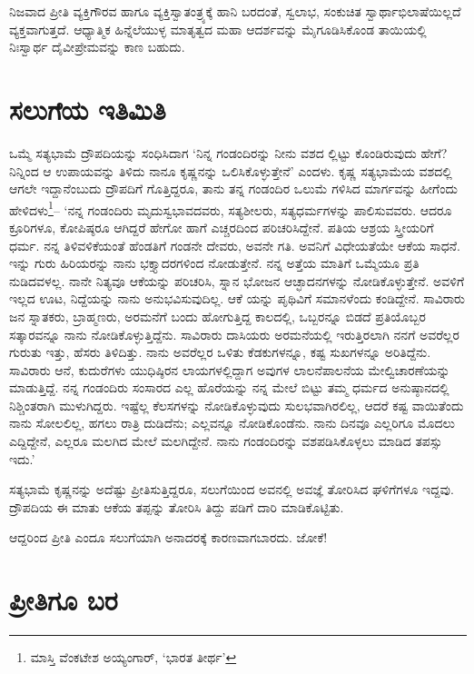 ನಿಜವಾದ ಪ್ರೀತಿ ವ್ಯಕ್ತಿಗೌರವ ಹಾಗೂ ವ್ಯಕ್ತಿಸ್ವಾತಂತ್ರ್ಯಕ್ಕೆ ಹಾನಿ ಬರದಂತೆ, ಸ್ವಲಾಭ, ಸಂಕುಚಿತ ಸ್ವಾರ್ಥಾಭಿಲಾಷೆಯಿಲ್ಲದೆ ವ್ಯಕ್ತವಾಗುತ್ತದೆ. ಆಧ್ಯಾತ್ಮಿಕ ಹಿನ್ನೆಲೆಯುಳ್ಳ ಮಾತೃತ್ವದ ಮಹಾ ಆದರ್ಶವನ್ನು ಮೈಗೂಡಿಸಿಕೊಂಡ ತಾಯಿಯಲ್ಲಿ ನಿಃಸ್ವಾರ್ಥ ದೈವೀಪ್ರೇಮವನ್ನು ಕಾಣ ಬಹುದು.


\section{ಸಲುಗೆಯ ಇತಿಮಿತಿ}

ಒಮ್ಮೆ ಸತ್ಯಭಾಮೆ ದ್ರೌಪದಿಯನ್ನು ಸಂಧಿಸಿದಾಗ ‘ನಿನ್ನ ಗಂಡಂದಿರನ್ನು ನೀನು ವಶದ ಲ್ಲಿಟ್ಟು ಕೊಂಡಿರುವುದು ಹೇಗೆ? ನಿನ್ನಿಂದ ಆ ಉಪಾಯವನ್ನು ತಿಳಿದು ನಾನೂ ಕೃಷ್ಣನನ್ನು ಒಲಿಸಿಕೊಳ್ಳುತ್ತೇನೆ’ ಎಂದಳು. ಕೃಷ್ಣ ಸತ್ಯಭಾಮೆಯ ವಶದಲ್ಲಿ ಆಗಲೇ ಇದ್ದಾನೆಂಬುದು ದ್ರೌಪದಿಗೆ ಗೊತ್ತಿದ್ದರೂ, ತಾನು ತನ್ನ ಗಂಡಂದಿರ ಒಲುಮೆ ಗಳಿಸಿದ ಮಾರ್ಗವನ್ನು ಹೀಗೆಂದು ಹೇಳಿದಳು\footnote{ ಮಾಸ್ತಿ ವೆಂಕಟೇಶ ಅಯ್ಯಂಗಾರ್, ‘ಭಾರತ ತೀರ್ಥ’}– ‘ನನ್ನ ಗಂಡಂದಿರು ಮೃದುಸ್ವಭಾವದವರು, ಸತ್ಯಶೀಲರು, ಸತ್ಯಧರ್ಮಗಳನ್ನು ಪಾಲಿಸುವವರು. ಆದರೂ ಕ್ರೂರಿಗಳೂ, ಕೋಪಿಷ್ಠರೂ ಆಗಿದ್ದರೆ ಹೇಗೋ ಹಾಗೆ ಎಚ್ಚರದಿಂದ ಪರಿಚರಿಸಿದ್ದೇನೆ. ಪತಿಯ ಆಶ್ರಯ ಸ್ತ್ರೀಯರಿಗೆ ಧರ್ಮ. ನನ್ನ ತಿಳಿವಳಿಕೆಯಂತೆ ಹೆಂಡತಿಗೆ ಗಂಡನೇ ದೇವರು, ಅವನೇ ಗತಿ. ಅವನಿಗೆ ವಿಧೇಯತೆಯೇ ಆಕೆಯ ಸಾಧನೆ. ಇನ್ನು ಗುರು ಹಿರಿಯರನ್ನು ನಾನು ಭಕ್ತ್ಯಾದರಗಳಿಂದ ನೋಡುತ್ತೇನೆ. ನನ್ನ ಅತ್ತೆಯ ಮಾತಿಗೆ ಒಮ್ಮೆಯೂ ಪ್ರತಿ ನುಡಿದವಳಲ್ಲ. ನಾನೇ ನಿತ್ಯವೂ ಆಕೆಯನ್ನು ಪರಿಚರಿಸಿ, ಸ್ನಾನ ಭೋಜನ ಆಚ್ಛಾದನಗಳನ್ನು ನೋಡಿಕೊಳ್ಳುತ್ತೇನೆ. ಅವಳಿಗೆ ಇಲ್ಲದ ಊಟ, ನಿದ್ದೆಯನ್ನು ನಾನು ಅನುಭವಿಸುವುದಿಲ್ಲ. ಆಕೆ ಯನ್ನು ಪೃಥಿವಿಗೆ ಸಮಾನಳೆಂದು ಕಂಡಿದ್ದೇನೆ. ಸಾವಿರಾರು ಜನ ಸ್ನಾತಕರು, ಬ್ರಾಹ್ಮಣರು, ಅರಮನೆಗೆ ಬಂದು ಹೋಗುತ್ತಿದ್ದ ಕಾಲದಲ್ಲಿ, ಒಬ್ಬರನ್ನೂ ಬಿಡದೆ ಪ್ರತಿಯೊಬ್ಬರ ಸತ್ಕಾರವನ್ನೂ ನಾನು ನೋಡಿಕೊಳ್ಳುತ್ತಿದ್ದೆನು. ಸಾವಿರಾರು ದಾಸಿಯರು ಅರಮನೆಯಲ್ಲಿ ಇರುತ್ತಿರಲಾಗಿ ನನಗೆ ಅವರೆಲ್ಲರ ಗುರುತು ಇತ್ತು, ಹೆಸರು ತಿಳಿದಿತ್ತು. ನಾನು ಅವರೆಲ್ಲರ ಒಳಿತು ಕೆಡಕುಗಳನ್ನೂ, ಕಷ್ಟ ಸುಖಗಳನ್ನೂ ಅರಿತಿದ್ದೆನು. ಸಾವಿರಾರು ಆನೆ, ಕುದುರೆಗಳು ಯುಧಿಷ್ಠಿರನ ಲಾಯಗಳಲ್ಲಿದ್ದಾಗ ಅವುಗಳ ಲಾಲನೆಪಾಲನೆಯ ಮೇಲ್ವಿಚಾರಣೆಯನ್ನು ಮಾಡುತ್ತಿದ್ದೆ. ನನ್ನ ಗಂಡಂದಿರು ಸಂಸಾರದ ಎಲ್ಲ ಹೊರೆಯನ್ನು ನನ್ನ ಮೇಲೆ ಬಿಟ್ಟು ತಮ್ಮ ಧರ್ಮದ ಅನುಷ್ಠಾನದಲ್ಲಿ ನಿಶ್ಚಿಂತರಾಗಿ ಮುಳುಗಿದ್ದರು. ಇಷ್ಟೆಲ್ಲ ಕೆಲಸಗಳನ್ನು ನೋಡಿಕೊಳ್ಳುವುದು ಸುಲಭವಾಗಿರಲಿಲ್ಲ, ಆದರೆ ಕಷ್ಟ ವಾಯಿತೆಂದು ನಾನು ಸೋಲಲಿಲ್ಲ, ಹಗಲು ರಾತ್ರಿ ದುಡಿದೆನು; ಎಲ್ಲವನ್ನೂ ನೋಡಿಕೊಂಡೆನು. ನಾನು ದಿನವೂ ಎಲ್ಲರಿಗೂ ಮೊದಲು ಎದ್ದಿದ್ದೇನೆ, ಎಲ್ಲರೂ ಮಲಗಿದ ಮೇಲೆ ಮಲಗಿದ್ದೇನೆ. ನಾನು ಗಂಡಂದಿರನ್ನು ವಶಪಡಿಸಿಕೊಳ್ಳಲು ಮಾಡಿದ ತಪಸ್ಸು ಇದು.’

ಸತ್ಯಭಾಮೆ ಕೃಷ್ಣನನ್ನು ಅದೆಷ್ಟು ಪ್ರೀತಿಸುತ್ತಿದ್ದರೂ, ಸಲುಗೆಯಿಂದ ಅವನಲ್ಲಿ ಅವಜ್ಞೆ ತೋರಿಸಿದ ಘಳಿಗೆಗಳೂ ಇದ್ದವು. ದ್ರೌಪದಿಯ ಈ ಮಾತು ಆಕೆಯ ತಪ್ಪನ್ನು ತೋರಿಸಿ ತಿದ್ದು ಪಡಿಗೆ ದಾರಿ ಮಾಡಿಕೊಟ್ಟಿತು.

ಆದ್ದರಿಂದ ಪ್ರೀತಿ ಎಂದೂ ಸಲುಗೆಯಾಗಿ ಅನಾದರಕ್ಕೆ ಕಾರಣವಾಗಬಾರದು. ಜೋಕೆ!


\section{ಪ್ರೀತಿಗೂ ಬರ}

